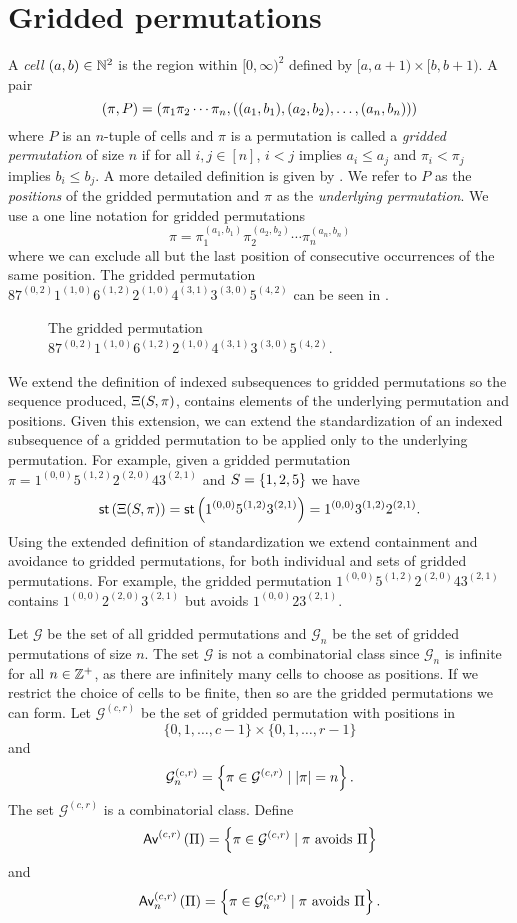 \section{Gridded permutations\label{sec:griddedpermutations}}
A \emph{cell} $(a,b) \in \mathbb{N}^2$ is the region within $[0,\infty)^2$ defined by $[a, a+1) \times [b, b+1).$ A pair
\[
    (\pi,P) = (\pi_1 \pi_2 \dotsm \pi_{n}, ((a_1,b_1),(a_2,b_2),\dotsc,(a_n,b_n)))
\]
where $P$ is an $n$-tuple of cells and $\pi$ is a permutation is called a \emph{gridded permutation} of size $n$ if for all $i,j \in [n]$, $i<j$ implies $a_i \leq a_j$ and $\pi_i < \pi_j$ implies $b_i \leq b_j$. A more detailed definition is given by . We refer to $P$ as the \emph{positions} of the gridded permutation and $\pi$ as the \emph{underlying permutation}. We use a one line notation for gridded permutations 
\[
    \pi = \pi_1^{(a_1,b_1)}\pi_2^{(a_2,b_2)}\dotsb\pi_n^{(a_n,b_n)}
\]
where we can exclude all but the last position of consecutive occurrences of the same position. The gridded permutation $87^{(0,2)}1^{(1,0)}6^{(1,2)}2^{(1,0)}4^{(3,1)}3^{(3,0)}5^{(4,2)}$ can be seen in .

\begin{figure}[htbp]
    \centering
    
    \caption{The gridded permutation $87^{(0,2)}1^{(1,0)}6^{(1,2)}2^{(1,0)}4^{(3,1)}3^{(3,0)}5^{(4,2)}$.}
    \label{fig:gridded_perm}
\end{figure}

We extend the definition of indexed subsequences to gridded permutations so the sequence produced, $\Xi(S,\pi)$, contains elements of the underlying permutation and positions. Given this extension, we can extend the standardization of an indexed subsequence of a gridded permutation to be applied only to the underlying permutation. For example, given a gridded permutation $\pi = 1^{(0,0)}5^{(1,2)}2^{(2,0)}43^{(2,1)}$ and $S=\left\{1,2,5\right\}$ we have
\[
\textsf{st}\left(\Xi(S,\pi)\right) = \textsf{st}\left(1^{(0,0)}5^{(1,2)}3^{(2,1)}\right) = 1^{(0,0)}3^{(1,2)}2^{(2,1)}.
\]
Using the extended definition of standardization we extend containment and avoidance to gridded permutations, for both individual and sets of gridded permutations. For example, the gridded permutation $1^{(0,0)}5^{(1,2)}2^{(2,0)}43^{(2,1)}$ contains $1^{(0,0)}2^{(2,0)}3^{(2,1)}$ but avoids $1^{(0,0)}23^{(2,1)}$.

Let $\mathcal{G}$ be the set of all gridded permutations and $\mathcal{G}_n$ be the set of gridded permutations of size $n$. The set $\mathcal{G}$ is not a combinatorial class since $\mathcal{G}_n$ is infinite for all $n \in \mathbb{Z}^+$, as there are infinitely many cells to choose as positions. If we restrict the choice of cells to be finite, then so are the gridded permutations we can form. Let $\mathcal{G}^{(c,r)}$ be the set of gridded permutation with positions in 
\[
\{0,1,\dotsc,c-1\} \times \{0,1,\dotsc,r-1\}
\]
and
\[
\mathcal{G}^{(c,r)}_n = \left\{\pi \in \mathcal{G}^{(c,r)} \mid |\pi| = n\right\}.
\]
The set $\mathcal{G}^{(c,r)}$ is a combinatorial class. Define
\[
    \textsf{Av}^{(c,r)}\left(\Pi\right) = \left\{\pi \in \mathcal{G}^{(c,r)} \mid \pi \text{ avoids } \Pi\right\}
\]
and
\[
    \textsf{Av}_n^{(c,r)}\left(\Pi\right) = \left\{\pi \in \mathcal{G}_n^{(c,r)} \mid \pi \text{ avoids } \Pi\right\}.
\]

